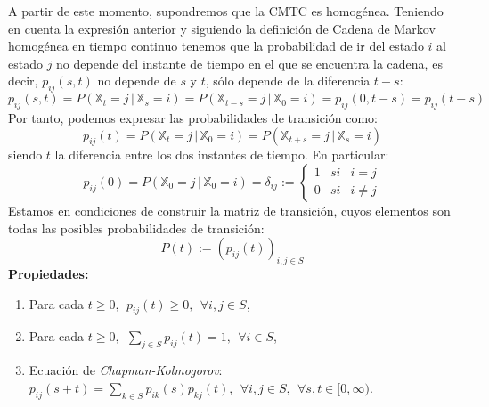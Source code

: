 \documentclass[12pt,a4paper]{article}
\begin{document}
A partir de este momento, supondremos que la CMTC es homogénea. Teniendo en cuenta la expresión anterior y siguiendo la definición de Cadena de Markov homogénea en tiempo continuo tenemos que la probabilidad de ir del estado $i$ al estado $j$ no depende del instante de tiempo en el que se encuentra la cadena, es decir, $p_{ij}(s,t)$ no depende de $s$ y $t$, sólo depende de la diferencia $t-s$:
$$p_{ij}(s,t)=P(\mathbb{X}_t=j\, | \, \mathbb{X}_s=i)=P(\mathbb{X}_{t-s}=j\, | \, \mathbb{X}_0=i)=p_{ij}(0,t-s)=p_{ij}(t-s)$$
Por tanto, podemos expresar las probabilidades de transición como:
$$p_{ij}(t)=P(\mathbb{X}_t=j\, | \, \mathbb{X}_0=i)=P(\mathbb{X}_{t+s}=j\, | \, \mathbb{X}_s=i)$$
siendo $t$ la diferencia entre los dos instantes de tiempo. En particular:
$$p_{ij}(0)=P(\mathbb{X}_0=j\, | \, \mathbb{X}_0=i)=\delta_{ij}:= \left\{ \begin{array}{lcc}
   	   	             1 &   si  & i=j \\
   	   	             0 &  si & i\neq j
   	   	             \end{array} \right. $$
Estamos en condiciones de construir la matriz de transición, cuyos elementos son todas las posibles probabilidades de transición:
$$P(t):=(p_{ij}(t))_{i,j\in S}$$
\textbf{Propiedades:}
\begin{enumerate}
\item Para cada $t\geq 0, \ \ p_{ij}(t)\geq 0, \ \ \forall i,j\in S$,
\item Para cada $t\geq 0, \ \ \sum\limits_{j\in S}p_{ij}(t)=1, \ \ \forall i\in S$,
\item Ecuación de \textit{Chapman-Kolmogorov}: 
$p_{ij}(s+t)=\sum\limits_{k\in S}p_{ik}(s)p_{kj}(t), \ \ \forall i,j\in S, \ \ \forall s,t\in[0,\infty)$.
\end{enumerate}
\end{document}
